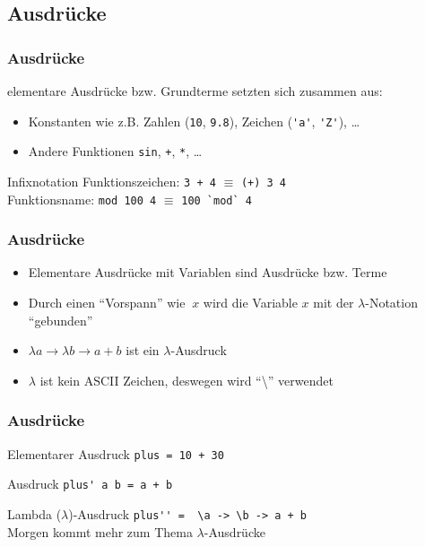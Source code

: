 \subsection{Ausdrücke}
\begin{frame}
\frametitle{Ausdrücke}
\begin{block}{\vspace*{-3ex}}
elementare Ausdrücke bzw. Grundterme setzten sich zusammen aus:
\begin{itemize}
  \item Konstanten wie z.B. Zahlen (\lstinline|10|, \lstinline|9.8|), Zeichen (\lstinline|'a'|, \lstinline|'Z'|), \ldots
  \item Andere Funktionen \lstinline|sin|, \lstinline|+|, \lstinline|*|, \ldots
\end{itemize}
\end{block}
\begin{alertblock}{Infixnotation}
Funktionszeichen: \lstinline|3 + 4| $\equiv$ \lstinline|(+) 3 4|\\
Funktionsname: \lstinline|mod 100 4| $\equiv$ \lstinline|100 `mod` 4|
\end{alertblock}
\end{frame}

\begin{frame}
\frametitle{Ausdrücke}
\begin{block}{\vspace*{-3ex}}
\begin{itemize}
  \item Elementare Ausdrücke mit Variablen sind Ausdrücke bzw. Terme
  \item Durch einen "`Vorspann"' wie $\ x$ wird die Variable $x$ mit der $\lambda$-Notation "`gebunden"'
  \item $\lambda a \to \lambda b \to a + b$ ist ein $\lambda$-Ausdruck
  \item $\lambda$ ist kein ASCII Zeichen, deswegen wird "`\textbackslash"' verwendet 
\end{itemize}
\end{block}
\end{frame}

\begin{frame}[fragile]
\frametitle{Ausdrücke} 
\begin{exampleblock}{Elementarer Ausdruck}
\lstinline|plus = 10 + 30|
\end{exampleblock}
\begin{exampleblock}{Ausdruck}
\lstinline|plus' a b = a + b|
\end{exampleblock}
\begin{exampleblock}{Lambda ($\lambda$)-Ausdruck}
\lstinline|plus'' =  \a -> \b -> a + b|\\
Morgen kommt mehr zum Thema $\lambda$-Ausdrücke
\end{exampleblock}
\end{frame}

